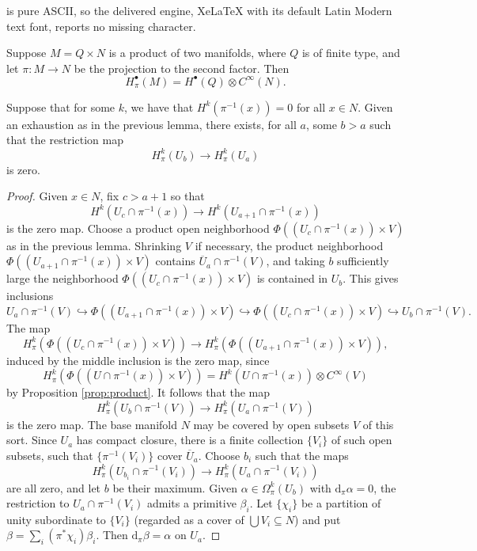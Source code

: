 \documentclass[10pt,a4paper]{amsart}
\newcommand{\hra}{\hookrightarrow}
\newcommand{\ol}{\overline}
\renewcommand{\d}{{\mbox{d}}}
\renewcommand{\subset}{\subseteq}
\begin{document}
is pure ASCII, so the delivered engine, XeLaTeX with its default Latin Modern text font, reports no missing character.
\begin{proposition}[Products] \label{prop:product}
	Suppose $M=Q\times N$ 	is a product of two manifolds, where $Q$ is of finite type, and let $\pi\colon M\to N$ be the projection to the second factor. 
	Then 
	\[ H_\pi^\bullet(M)=H^\bullet(Q)\otimes C^\infty(N).\]
\end{proposition}

\begin{lemma}\label{lem:3.6}
	Suppose that for some $k$, we have that 
	$H^k(\pi^{-1}(x))=0$ for all $x\in N$. Given an exhaustion as in the previous lemma, there exists, for all $a$, some $b>a$ such that the restriction map  
	\[ H^k_\pi(U_{b})\to H^k_\pi(U_a)\]
	is zero. 
\end{lemma}

\begin{proof}\phantom{.}
	Given $x\in N$, fix  $c>a+1$ so that 	
	\[ H^k(U_{c}\cap \pi^{-1}(x))\to H^k(U_{a+1}\cap \pi^{-1}(x))\]
	is the zero map. 
	Choose a product open neighborhood $\Phi((U_c\cap \pi^{-1}(x))\times V)$ as in 
	the previous lemma. 
	Shrinking $V$ if necessary, the product neighborhood  $\Phi((U_{a+1}\cap \pi^{-1}(x))\times V)$ contains 
	$\ol{U}_{a}\cap \pi^{-1}(V)$, and taking $b$ sufficiently large the neighborhood $\Phi((U_c\cap \pi^{-1}(x))\times V)$ 
	is contained in $U_b$. This gives inclusions
	\[ U_{a}\cap \pi^{-1}(V)\hra  \Phi((U_{a+1}\cap \pi^{-1}(x))\times V)\hra \Phi((U_c\cap \pi^{-1}(x))\times V)
	\hra U_b\cap \pi^{-1}(V)
	.\]
  The map 
   \[ H^k_\pi (\Phi((U_c\cap \pi^{-1}(x))\times V))\to  H^k_\pi (\Phi((U_{a+1}\cap \pi^{-1}(x))\times V)),\]
 induced by the middle inclusion is the zero map, since 
 \[ H^k_\pi (\Phi((U\cap \pi^{-1}(x))\times V))=H^k(U\cap \pi^{-1}(x))\otimes C^\infty(V)\]
 by Proposition \ref{prop:product}. It follows that the map 
   \[ H^k_\pi(U_{b}\cap \pi^{-1}(V))\to H^k_\pi(U_a\cap \pi^{-1}(V))\]
 is the zero map.  The base manifold $N$ may be covered by open subsets $V$ of this sort. Since 
   $U_a$ has compact closure, there is a finite collection $\{V_i\}$ of such open subsets, such that 
   $\{\pi^{-1}(V_i)\}$ cover $\ol{U}_a$. Choose $b_i$ such that the maps 
     \[ H^k_\pi(U_{b_i}\cap \pi^{-1}(V_i))\to H^k_\pi(U_a\cap \pi^{-1}(V_i))\]
  are all zero, and let $b$ be their maximum. Given $\alpha\in \Omega^k_\pi(U_b)$ with $\d_\pi\alpha=0$, 
  the restriction to $U_{a}\cap \pi^{-1}(V_i)$ admits a primitive $\beta_i$. 
  Let  $\{\chi_i\}$ be a partition of unity  subordinate to $\{V_i\}$ (regarded as a cover of $\bigcup V_i\subset N$) 
    and put $\beta=\sum_i (\pi^*\chi_i)\beta_i$. 
  Then $\d_\pi\beta=\alpha$ on $U_a$. 
\end{proof}
\end{document}
